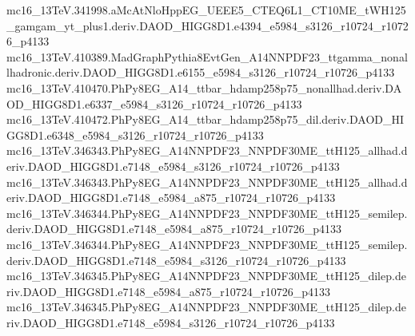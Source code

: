 mc16_13TeV.341998.aMcAtNloHppEG_UEEE5_CTEQ6L1_CT10ME_tWH125_gamgam_yt_plus1.deriv.DAOD_HIGG8D1.e4394_e5984_s3126_r10724_r10726_p4133 \\
mc16_13TeV.410389.MadGraphPythia8EvtGen_A14NNPDF23_ttgamma_nonallhadronic.deriv.DAOD_HIGG8D1.e6155_e5984_s3126_r10724_r10726_p4133 \\
mc16_13TeV.410470.PhPy8EG_A14_ttbar_hdamp258p75_nonallhad.deriv.DAOD_HIGG8D1.e6337_e5984_s3126_r10724_r10726_p4133 \\
mc16_13TeV.410472.PhPy8EG_A14_ttbar_hdamp258p75_dil.deriv.DAOD_HIGG8D1.e6348_e5984_s3126_r10724_r10726_p4133 \\
mc16_13TeV.346343.PhPy8EG_A14NNPDF23_NNPDF30ME_ttH125_allhad.deriv.DAOD_HIGG8D1.e7148_e5984_s3126_r10724_r10726_p4133 \\
mc16_13TeV.346343.PhPy8EG_A14NNPDF23_NNPDF30ME_ttH125_allhad.deriv.DAOD_HIGG8D1.e7148_e5984_a875_r10724_r10726_p4133 \\
mc16_13TeV.346344.PhPy8EG_A14NNPDF23_NNPDF30ME_ttH125_semilep.deriv.DAOD_HIGG8D1.e7148_e5984_a875_r10724_r10726_p4133 \\
mc16_13TeV.346344.PhPy8EG_A14NNPDF23_NNPDF30ME_ttH125_semilep.deriv.DAOD_HIGG8D1.e7148_e5984_s3126_r10724_r10726_p4133 \\
mc16_13TeV.346345.PhPy8EG_A14NNPDF23_NNPDF30ME_ttH125_dilep.deriv.DAOD_HIGG8D1.e7148_e5984_a875_r10724_r10726_p4133 \\
mc16_13TeV.346345.PhPy8EG_A14NNPDF23_NNPDF30ME_ttH125_dilep.deriv.DAOD_HIGG8D1.e7148_e5984_s3126_r10724_r10726_p4133 \\

